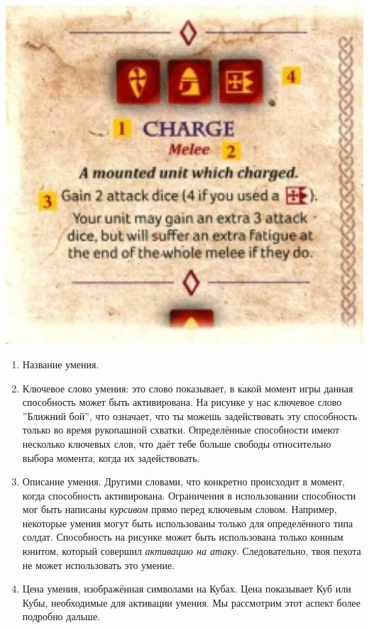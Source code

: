 \documentclass[a4paper,11pt,twoside]{article}
\begin{document}
\includegraphics[width=1.0\textwidth]{pics/SagaPlacingDice.jpg}
\begin{enumerate}
\item Название умения.
\item Ключевое слово умения: это слово показывает, в какой момент игры данная способность может быть активирована. На рисунке у нас ключевое слово ''Ближний бой'', что означает, что ты можешь задействовать эту способность только во время рукопашной схватки. Определённые способности имеют несколько ключевых слов, что даёт тебе больше свободы относительно выбора момента, когда их задействовать.
\item Описание умения. Другими словами, что конкретно происходит в момент, когда способность активирована. Ограничения в использовании способности мог быть написаны \textit{курсивом} прямо перед ключевым словом. Например, некоторые умения могут быть использованы только для определённого типа солдат. Способность на рисунке может быть использована только конным юнитом, который совершил \textit{активацию на атаку}. Следовательно, твоя пехота не может использовать это умение.
\item Цена умения, изображённая символами на Кубах. Цена показывает Куб или Кубы, необходимые для активации умения. Мы рассмотрим этот аспект более подробно дальше.
\end{enumerate}
\end{document}
